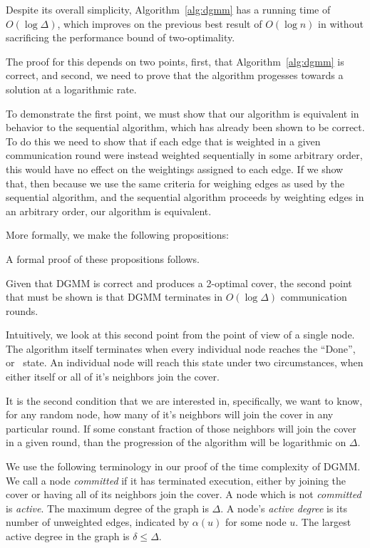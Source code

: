 \label{ssb:algorithms-dgmm-performance}

Despite its overall simplicity, Algorithm~\ref{alg:dgmm} has a running time of $O(\log \Delta)$, which improves on the previous best result of $O(\log n)$ in \cite{1582746} without sacrificing the performance bound of two-optimality. 

The proof for this depends on two points, first, that Algorithm~\ref{alg:dgmm} is correct, and second, we need to prove that the algorithm progesses towards a solution at a logarithmic rate. 

To demonstrate the first point, we must show that our algorithm is equivalent in behavior to the sequential algorithm, which has already been shown to be correct\cite{Gonzalez1995129}. To do this we need to show that if each edge that is weighted in a given communication round were instead weighted sequentially in some arbitrary order, this would have no effect on the weightings assigned to each edge. If we show that, then because we use the same criteria for weighing edges as used by the sequential algorithm, and the sequential algorithm proceeds by weighting edges in an arbitrary order, our algorithm is equivalent.

More formally, we make the following propositions:





A formal proof of these propositions follows.



Given that DGMM is correct and produces a 2-optimal cover, the second point that must be shown is that DGMM terminates in $O(\log{\Delta})$ communication rounds.

Intuitively, we look at this second point from the point of view of a single node. The algorithm itself terminates when every individual node reaches the ``Done'', or \cDd\ state. An individual node will reach this state under two circumstances, when either itself or all of it's neighbors join the cover.

It is the second condition that we are interested in, specifically, we want to know, for any random node, how many of it's neighbors will join the cover in any particular round. If some constant fraction of those neighbors will join the cover in a given round, than the progression of the algorithm will be logarithmic on $\Delta$. 

We use the following terminology in our proof of the time complexity of DGMM. We call a node {\em committed} if it has terminated execution, either by joining the cover or having all of its neighbors join the cover. A node which is not {\em committed} is {\em active}. The maximum degree of the graph is $\Delta$. A node's {\em active degree} is its number of unweighted edges, indicated by $\alpha(u)$ for some node $u$. The largest active degree in the graph is $\delta \le \Delta$. 

